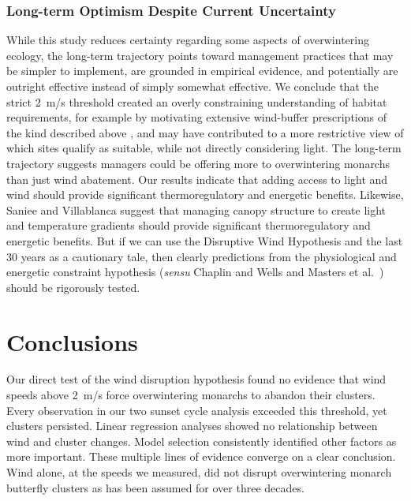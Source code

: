 \documentclass[insects,article,submit,pdftex,moreauthors]{Definitions/mdpi}
\begin{document}
\subsubsection{Long-term Optimism Despite Current Uncertainty}

While this study reduces certainty regarding some aspects of overwintering ecology, the long-term trajectory points toward management practices that may be simpler to implement, are grounded in empirical evidence, and potentially are outright effective instead of simply somewhat effective. We conclude that the strict 2~m/s threshold created an overly constraining understanding of habitat requirements, for example by motivating extensive wind-buffer prescriptions of the kind described above \cite{althouse&meadeinc.EllwoodMesaSperling2023}, and may have contributed to a more restrictive view of which sites qualify as suitable, while not directly considering light. The long-term trajectory suggests managers could be offering more to overwintering monarchs than just wind abatement. Our results indicate that adding access to light and wind should provide significant thermoregulatory and energetic benefits. Likewise, Saniee and Villablanca \cite{sanieeHierarchyScaleInfluence2022} suggest that managing canopy structure to create light and temperature gradients should provide significant thermoregulatory and energetic benefits. But if we can use the Disruptive Wind Hypothesis and the last 30 years as a cautionary tale, then clearly predictions from the physiological and energetic constraint hypothesis (\textit{sensu} Chaplin and Wells \cite{chaplinEnergyReservesMetabolic1982} and Masters et al.\ \cite{mastersMonarchButterflyDanaus1988}) should be rigorously tested.


\section{Conclusions}

Our direct test of the wind disruption hypothesis found no evidence that wind speeds above 2~m/s force overwintering monarchs to abandon their clusters. Every observation in our two sunset cycle analysis exceeded this threshold, yet clusters persisted. Linear regression analyses showed no relationship between wind and cluster changes. Model selection consistently identified other factors as more important. These multiple lines of evidence converge on a clear conclusion. Wind alone, at the speeds we measured, did not disrupt overwintering monarch butterfly clusters as has been assumed for over three decades.
\end{document}
